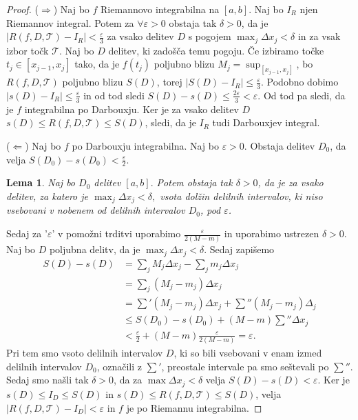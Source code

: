\documentclass[10pt, a4paper]{article}
\newtheorem{lema}[izr]{Lema}
\newenvironment{noticeC}{%
  \tcolorbox[%
  notitle,
  empty,
  enhanced,  %
  breakable,
  coltext=black, 
  fontupper=\rmfamily,
  parbox=false,
  noparskip,
  sharp corners,
  boxrule=-1pt,  %
  frame hidden,
  left=7pt,  %
  right=7pt,
  top=5pt,
  bottom=5pt,
  before skip=2.5ex plus 2pt,
  after skip=2.5ex plus 2pt,
  overlay unbroken and last={%
  },
  ]}
{\endtcolorbox}
\newenvironment{dokaz}%
  {\begin{noticeC}\begin{proof}}%
  {\end{proof}\end{noticeC}}
\begin{document}
\begin{dokaz}
    ($\Rightarrow$) Naj bo $f$ Riemannovo integrabilna na $[a, b]$. Naj bo $I_R$ njen Riemannov integral.
    Potem za $\forall \varepsilon > 0$ obstaja tak $\delta > 0$, da je $|R(f, D, \mathcal{T}) - I_R| < \frac{\varepsilon}{3}$ za vsako delitev $D$ s pogojem $\max_j \Delta x_j < \delta$ in za vsak izbor točk $\mathcal{T}$.
    Naj bo $D$ delitev, ki zadošča temu pogoju.
    Če izbiramo točke $t_j \in [x_{j-1} , x_j]$ tako, da je $f(t_j)$ poljubno blizu $M_j = \sup_{[x_{j-1}, x_j]}$, bo $R(f, D, \mathcal{T})$ poljubno blizu $S(D)$, torej $|S(D) - I_R| \leq \frac{\varepsilon}{3}$.
    Podobno dobimo $|s(D) - I_R| \leq \frac{\varepsilon}{3}$ in od tod sledi $S(D) - s(D) \leq \frac{2 \varepsilon}{3} < \varepsilon$.
    Od tod pa sledi, da je $f$ integrabilna po Darbouxju. Ker je za vsako delitev $D$
    $s(D) \leq R(f, D, \mathcal{T}) \leq S(D)$, sledi, da je $I_R$ tudi Darbouxjev integral.

    ($\Leftarrow$) Naj bo $f$ po Darbouxju integrabilna. Naj bo $\varepsilon > 0.$
    Obstaja delitev $D_0$, da velja $S(D_0) - s(D_0) < \frac{\varepsilon}{2}$.
    \begin{lema}
        Naj bo $D_0$ delitev $[a, b].$ Potem obstaja tak $\delta > 0$, da je za vsako delitev, za katero je $\max_j \Delta x_j < \delta,$ vsota dolžin delilnih intervalov, ki niso vsebovani v nobenem od delilnih intervalov $D_0$, pod $\varepsilon$.
    \end{lema}
        Sedaj za '$\varepsilon$' v pomožni trditvi uporabimo $\frac{\varepsilon}{2(M - m)}$ in uporabimo ustrezen $\delta > 0$.
        Naj bo $D$ poljubna delitv, da je $\max_{j} \Delta x_j < \delta.$ Sedaj zapišemo
        \begin{align*}
            S(D) - s(D) &= \sum_j M_j \Delta x_j - \sum _j m_j \Delta x_j\\
            &= \sum_j (M_j - m_j) \Delta x_j\\
            &= \sum ' (M_j - m_j) \Delta x_j + \sum '' (M_j - m_j) \Delta_j\\
            &\leq S(D_0) - s(D_0) + (M - m) \sum '' \Delta x_j\\
            &< \frac{\varepsilon}{2} + (M-m) \frac{\varepsilon}{2(M-m)} = \varepsilon.
        \end{align*}
        Pri tem smo vsoto delilnih intervalov $D$, ki so bili vsebovani v enam izmed delilnih intervalov $D_0$, označili z $\sum'$, preostale intervale pa smo seštevali po $\sum''$.
        Sedaj smo našli tak $\delta > 0$, da za $\max \Delta x_j < \delta$ velja $S(D) - s(D) < \varepsilon.$
        Ker je $s(D) \leq I_D \leq S(D)$ in $s(D) \leq R(f, D, \mathcal{T}) \leq S(D)$, velja $|R(f, D, \mathcal{T}) - I_D| < \varepsilon$ in $f$ je po Riemannu integrabilna.
\end{dokaz}
\end{document}
